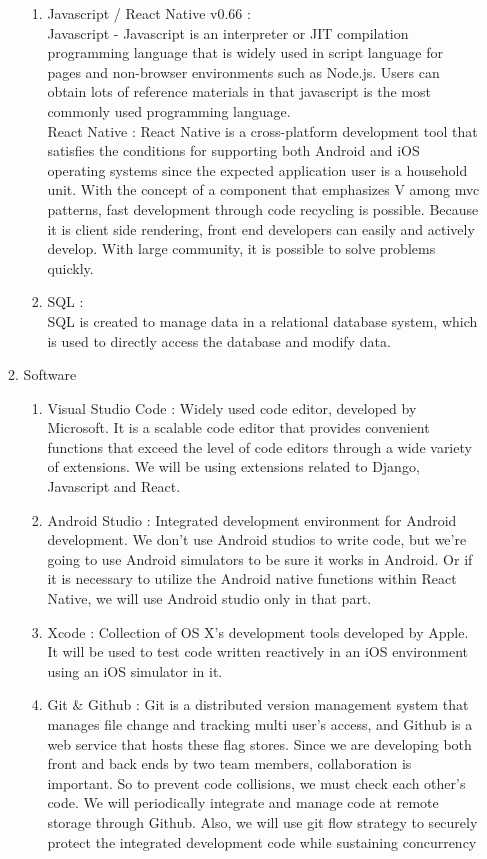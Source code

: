 \documentclass[11pt, conference]{IEEEtran}
\begin{document}
\begin{enumerate}[label=\arabic*]
\begin{enumerate}[label=\alph*]
\begin{enumerate}
            \item Javascript / React Native v0.66 : \\
            Javascript - Javascript is an interpreter or JIT compilation programming language that is widely used in script language for pages and non-browser environments such as Node.js. Users can obtain lots of reference materials in that javascript is the most commonly used programming language. \\
            React Native : React Native is a cross-platform development tool that satisfies the conditions for supporting both Android and iOS operating systems since the expected application user is a household unit. With the concept of a component that emphasizes V among mvc patterns, fast development through code recycling is possible. Because it is client side rendering, front end developers can easily and actively develop. With large community, it is possible to solve problems quickly.
            \item SQL : \\
            SQL is created to manage data in a relational database system, which is used to directly access the database and modify data.
        \end{enumerate}
        \item Software 
        \begin{enumerate}
            \item Visual Studio Code : Widely used code editor, developed by Microsoft. It is a scalable code editor that provides convenient functions that exceed the level of code editors through a wide variety of extensions. We will be using extensions related to Django, Javascript and React.
            \item Android Studio : Integrated development environment for Android development. We don’t use Android studios to write code, but we’re going to use Android simulators to be sure it works in Android. Or if it is necessary to utilize the Android native functions within React Native, we will use Android studio only in that part.
            \item Xcode : Collection of OS X’s development tools developed by Apple. It will be used to test code written reactively in an iOS environment using an iOS simulator in it.
            \item Git \& Github : Git is a distributed version management system that manages file change and tracking multi user's access, and Github is a web service that hosts these flag stores. Since we are developing both front and back ends by two team members, collaboration is important. So to prevent code collisions, we must check each other’s code. We will periodically integrate and manage code at remote storage through Github. Also, we will use git flow strategy to securely protect the integrated development  code while sustaining concurrency

\end{enumerate}
\end{enumerate}
\end{enumerate}
\end{document}

